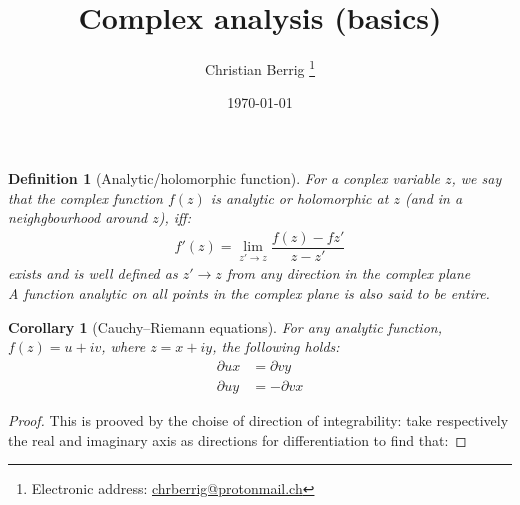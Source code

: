 \documentclass[a4paper,twoside]{article}
\title{Complex analysis (basics)}
\author[1]{Christian Berrig
\thanks{Electronic address: \href{mailto:chrberrig@protonmail.ch}{chrberrig@protonmail.ch}}
}
\affil[1]{Institute of Science and Environment, RUC}
\date{\today}
\newtheorem{theorem}{Theorem}
\newtheorem{corollary}{Corollary}[theorem]
\newtheorem{definition}{Definition} %
\begin{document}
\maketitle

\begin{definition}[Analytic/holomorphic function] 
	For a conplex variable $z$, we say that the complex function $f(z)$ is analytic or holomorphic at $z$ (and in a neighgbourhood around $z$), iff:
	\begin{align*}
		f'(z) = \lim_{z' \rightarrow z} \dfrac{f(z) - f{z'}}{z - z'}
	\end{align*}
	exists and is well defined as $z' \rightarrow z$ from any direction in the complex plane \\
	A function analytic on all points in the complex plane is also said to be entire.
\end{definition}

\begin{corollary}[Cauchy–Riemann equations]
	For any analytic function, $f(z) = u + iv$, where $z = x + iy$, the following holds:
	\begin{align*}
		\partial{u}{x} &= \partial{v}{y} \\
		\partial{u}{y} &= -\partial{v}{x}
	\end{align*}
\end{corollary}
\begin{proof}
	This is prooved by the choise of direction of integrability: take respectively the real and imaginary axis as directions for differentiation to find that:
	
\end{proof}

% 
% 
% 

 

\printbibliography      %
\end{document}
